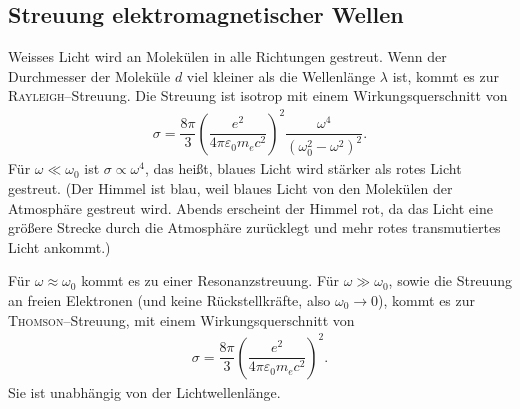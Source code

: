 \documentclass[a4paper,12pt]{article}
\numberwithin{equation}{section}
\begin{document}
\subsection{Streuung elektromagnetischer Wellen}
Weisses Licht wird an Molekülen in alle Richtungen gestreut. Wenn der Durchmesser der Moleküle $d$ viel kleiner als die Wellenlänge $\lambda $ ist, kommt es zur \textsc{Rayleigh}--Streuung. Die Streuung ist isotrop mit einem Wirkungsquerschnitt von
\begin{align} 
        \sigma =\dfrac{8\pi }{3}\left(\dfrac{e^2}{4\pi \varepsilon _0m_ec^2}\right)^2\dfrac{\omega ^4}{\left(\omega _0^2-\omega ^2\right)^2}
.\end{align} 
Für $\omega \ll \omega _0$ ist $\sigma \propto \omega ^4$, das heißt, blaues Licht wird stärker als rotes Licht gestreut. (Der Himmel ist blau, weil blaues Licht von den Molekülen der Atmosphäre gestreut wird. Abends erscheint der Himmel rot, da das Licht eine größere Strecke durch die Atmosphäre zurücklegt und mehr rotes transmutiertes Licht ankommt.)\par
Für $\omega \approx \omega _0$ kommt es zu einer Resonanzstreuung. Für $\omega \gg \omega _0$, sowie die Streuung an freien Elektronen (und keine Rückstellkräfte, also $\omega _0\rightarrow 0$), kommt es zur \textsc{Thomson}--Streuung, mit einem Wirkungsquerschnitt von
\begin{align} 
        \sigma =\dfrac{8\pi }{3}\left(\dfrac{e^2}{4\pi \varepsilon _0m_ec^2}\right)^2
.\end{align} 
Sie ist unabhängig von der Lichtwellenlänge.

\newpage
\end{document}
